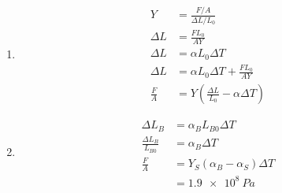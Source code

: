 \documentclass{article}
\begin{document}
\setcounter{subsubsection}{78}
\subsubsection{}

\begin{enumerate}
  \item

        \begin{align*}
          Y           & = \frac{F / A}{\Delta L / L_0}                            \\
          \Delta L    & = \frac{F L_0}{A Y}                                       \\
          \Delta L    & = \alpha L_0 \Delta T                                     \\
          \Delta L    & = \alpha L_0 \Delta T + \frac{F L_0}{A Y}                 \\
          \frac{F}{A} & = Y \left( \frac{\Delta L}{L_0} - \alpha \Delta T \right)
        \end{align*}

  \item

        \begin{align*}
          \Delta L_B                & = \alpha_B L_{B0} \Delta T           \\
          \frac{\Delta L_B}{L_{B0}} & = \alpha_B \Delta T                  \\
          \frac{F}{A}               & = Y_S (\alpha_B - \alpha_S) \Delta T \\
                                    & = \qty{1.9e8}{Pa}
        \end{align*}
\end{enumerate}

\setcounter{subsubsection}{84}
\subsubsection{}
\end{document}
